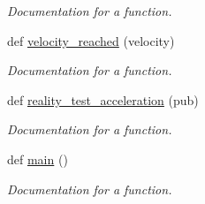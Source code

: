 \begin{DoxyCompactItemize}
\begin{DoxyCompactList}\small\item\em Documentation for a function. \end{DoxyCompactList}\item 
def \mbox{\hyperlink{namespacevelocity__test_a125db86a88728cf91ab4383613e22cd1}{velocity\+\_\+reached}} (velocity)
\begin{DoxyCompactList}\small\item\em Documentation for a function. \end{DoxyCompactList}\item 
def \mbox{\hyperlink{namespacevelocity__test_a5a1df3045e7c48f88802aed31b0f67af}{reality\+\_\+test\+\_\+acceleration}} (pub)
\begin{DoxyCompactList}\small\item\em Documentation for a function. \end{DoxyCompactList}\item 
def \mbox{\hyperlink{namespacevelocity__test_a8f407ca9d9142c949c0b88908466df6c}{main}} ()
\begin{DoxyCompactList}\small\item\em Documentation for a function. \end{DoxyCompactList}\end{DoxyCompactItemize}
